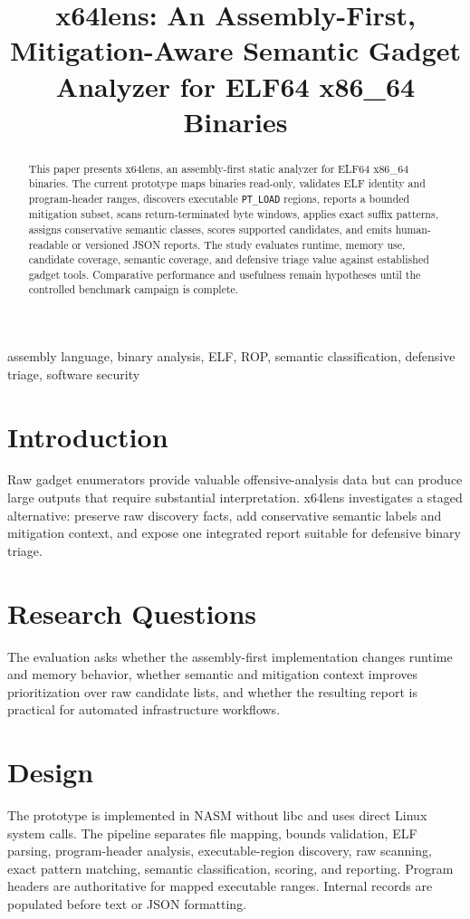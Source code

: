 \documentclass[conference]{IEEEtran}
\title{x64lens: An Assembly-First, Mitigation-Aware Semantic Gadget Analyzer for ELF64 x86\_64 Binaries}
\author{\IEEEauthorblockN{Kyle Pifer}
\IEEEauthorblockA{Dakota State University\\
Email: TBD}}
\begin{document}
\maketitle

\begin{abstract}
This paper presents x64lens, an assembly-first static analyzer for ELF64 x86\_64 binaries. The current prototype maps binaries read-only, validates ELF identity and program-header ranges, discovers executable \texttt{PT\_LOAD} regions, reports a bounded mitigation subset, scans return-terminated byte windows, applies exact suffix patterns, assigns conservative semantic classes, scores supported candidates, and emits human-readable or versioned JSON reports. The study evaluates runtime, memory use, candidate coverage, semantic coverage, and defensive triage value against established gadget tools. Comparative performance and usefulness remain hypotheses until the controlled benchmark campaign is complete.
\end{abstract}

\begin{IEEEkeywords}
assembly language, binary analysis, ELF, ROP, semantic classification, defensive triage, software security
\end{IEEEkeywords}

\section{Introduction}
Raw gadget enumerators provide valuable offensive-analysis data but can produce large outputs that require substantial interpretation. x64lens investigates a staged alternative: preserve raw discovery facts, add conservative semantic labels and mitigation context, and expose one integrated report suitable for defensive binary triage.

\section{Research Questions}
The evaluation asks whether the assembly-first implementation changes runtime and memory behavior, whether semantic and mitigation context improves prioritization over raw candidate lists, and whether the resulting report is practical for automated infrastructure workflows.

\section{Design}
The prototype is implemented in NASM without libc and uses direct Linux system calls. The pipeline separates file mapping, bounds validation, ELF parsing, program-header analysis, executable-region discovery, raw scanning, exact pattern matching, semantic classification, scoring, and reporting. Program headers are authoritative for mapped executable ranges. Internal records are populated before text or JSON formatting.
\end{document}
